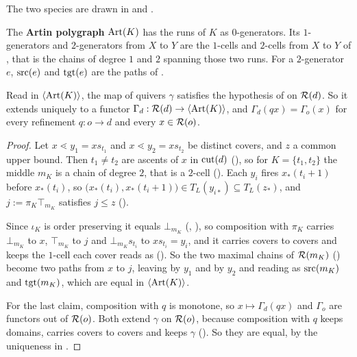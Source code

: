 \documentclass[11pt]{article}
\begin{document}
The two species are drawn in  and .
\begin{definition}\label{def:poly}
  The \textbf{Artin polygraph} $\operatorname{Art}(K)$ has the runs of $K$ as $0$-generators. Its
  $1$-generators and $2$-generators from $X$ to $Y$ are the $1$-cells and $2$-cells from $X$ to $Y$
  of , that is the chains of degree $1$ and $2$ spanning those two runs. For a
  $2$-generator $e$, $\operatorname{src}(e)$ and $\operatorname{tgt}(e)$ are the paths of .
\end{definition}


\begin{proposition}\label{prop:closes}
  Read in $\left\langle \operatorname{Art}(K) \right\rangle$, the map of quivers $\gamma$ satisfies the hypothesis of
   on $\mathcal{R}(d)$. So it extends uniquely to a functor
  $\Gamma_d : \mathcal{R}(d) \to \left\langle \operatorname{Art}(K) \right\rangle$, and $\Gamma_d(qx) = \Gamma_o(x)$ for every
  refinement $q : o \to d$ and every $x \in \mathcal{R}(o)$.
\end{proposition}
\begin{proof}
  Let $x \lessdot y_1 = xs_{t_1}$ and $x \lessdot y_2 = xs_{t_2}$ be distinct covers, and $z$ a
  common upper bound. Then $t_1 \neq t_2$ are ascents of $x$ in $\operatorname{cut}(d)$ (), so for
  $K = \{t_1, t_2\}$ the middle $m_K$ is a chain of degree $2$, that is a $2$-cell
  (). Each $y_i$ fires $x_*(t_i+1)$ before $x_*(t_i)$, so
  $\bigl(x_*(t_i), x_*(t_i+1)\bigr) \in T_L(y_{i*}) \subseteq T_L(z_*)$, and
  $j := \pi_K\top_{m_K}$ satisfies $j \le z$ ().

  Since $\iota_K$ is order preserving it equals $\bot_{m_K}$ (,
  ), so composition with $\pi_K$ carries $\bot_{m_K}$ to $x$, $\top_{m_K}$ to $j$
  and $\bot_{m_K}s_{t_i}$ to $xs_{t_i} = y_i$, and it carries covers to covers and keeps the
  $1$-cell each cover reads as (). So the two maximal chains of
  $\mathcal{R}(m_K)$ () become two paths from $x$ to $j$, leaving by $y_1$ and by
  $y_2$ and reading as $\operatorname{src}(m_K)$ and $\operatorname{tgt}(m_K)$, which are equal in $\left\langle \operatorname{Art}(K) \right\rangle$.

  For the last claim, composition with $q$ is monotone, so $x \mapsto \Gamma_d(qx)$ and $\Gamma_o$
  are functors out of $\mathcal{R}(o)$. Both extend $\gamma$ on $\mathcal{R}(o)$, because composition
  with $q$ keeps domains, carries covers to covers and keeps $\gamma$ (). So
  they are equal, by the uniqueness in .
\end{proof}
\end{document}
